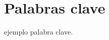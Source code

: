 \documentclass[12pt,a4paper]{article}
\begin{document}















%


 

\newpage{\ }

\thispagestyle{empty}

 

\newpage{\ }

\thispagestyle{empty}

\section*{Palabras clave}

ejemplo palabra clave.


\newpage{\ }

\thispagestyle{empty}

\tableofcontents

\newpage


\pagestyle{fancy}
\end{document}
